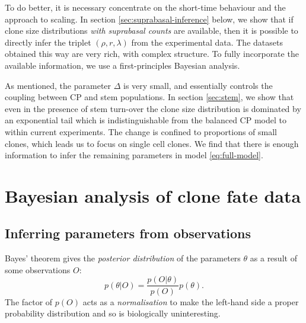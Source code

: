 \documentclass[10pt,UKenglish]{article}
\begin{document}
To do better, it is necessary concentrate on the short-time behaviour and the
approach to scaling. In section \ref{sec:suprabasal-inference} below, we show
that if clone size distributions \emph{with suprabasal counts} are available,
then it is possible to directly infer the triplet $(\rho, r, \lambda)$ from the
experimental data. The datasets obtained this way are very rich, with complex
structure. To fully incorporate the available information, we use a
first-principles Bayesian analysis.

As mentioned, the parameter $\Delta$ is very small, and essentially controls the
coupling between CP and stem populations. In section \ref{sec:stem}, we show
that even in the presence of stem turn-over the clone size distribution is
dominated by an exponential tail which is indistinguishable from the balanced CP
model to within current experiments. The change is confined to proportions of
small clones, which leads us to focus on single cell clones. We find that there
is enough information to infer the remaining parameters in model
\ref{eq:full-model}.

\section{\label{sec:suprabasal-inference}Bayesian analysis of clone fate data}

\subsection{Inferring parameters from observations}

Bayes' theorem gives the \emph{posterior distribution} of the parameters
$\theta$ as a result of some observations $O$: $$p(\theta|O) =
\frac{p(O|\theta)}{p(O)} p(\theta).$$ The factor of $p(O)$ acts as a
\emph{normalisation} to make the left-hand side a proper probability
distribution and so is biologically uninteresting. 
\end{document}
